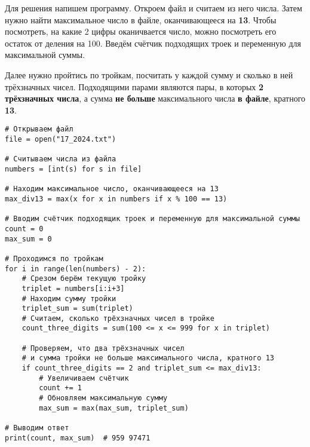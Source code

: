 \documentclass[14pt,a4paper]{article}
\begin{document}
Для решения напишем программу. Откроем файл и считаем из него числа.
Затем нужно найти максимальное число в файле, оканчивающееся на \textbf{13}.
Чтобы посмотреть, на какие 2 цифры оканичвается число, можно
посмотреть его остаток от деления на 100. Введём счётчик подходящих
троек и переменную для максимальной суммы.

Далее нужно пройтись по тройкам, посчитать у каждой сумму и сколько в
ней трёхзначных чисел. Подходящими парами являются пары, в которых
\textbf{2 трёхзначных числа}, а сумма \textbf{не больше}
максимального числа \textbf{в файле}, кратного \textbf{13}.

\begin{verbatim}
# Открываем файл
file = open("17_2024.txt")

# Считываем числа из файла
numbers = [int(s) for s in file]

# Находим максимальное число, оканчивающееся на 13
max_div13 = max(x for x in numbers if x % 100 == 13)

# Вводим счётчик подходящик троек и переменную для максимальной суммы
count = 0
max_sum = 0

# Проходимся по тройкам
for i in range(len(numbers) - 2):
    # Срезом берём текущую тройку
    triplet = numbers[i:i+3]
    # Находим сумму тройки
    triplet_sum = sum(triplet)
    # Считаем, сколько трёхзначных чисел в тройке
    count_three_digits = sum(100 <= x <= 999 for x in triplet)

    # Проверяем, что два трёхзначных чисел
    # и сумма тройки не больше максимального числа, кратного 13
    if count_three_digits == 2 and triplet_sum <= max_div13:
        # Увеличиваем счётчик
        count += 1
        # Обновляем максимальную сумму
        max_sum = max(max_sum, triplet_sum)

# Выводим ответ
print(count, max_sum)  # 959 97471
\end{verbatim}
\end{document}
